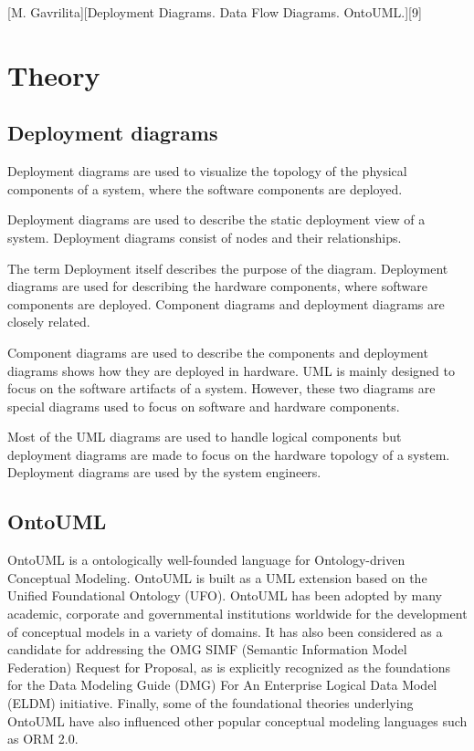 \documentclass{article}
\begin{document}
	[M. Gavrilita][Deployment Diagrams. Data Flow Diagrams. OntoUML.][9]

	\section{Theory}
		\subsection{Deployment diagrams}
			Deployment diagrams are used to visualize the topology of the physical components of a system, where the software components are deployed.

			Deployment diagrams are used to describe the static deployment view of a system. Deployment diagrams consist of nodes and their relationships.

			The term Deployment itself describes the purpose of the diagram. Deployment diagrams are used for describing the hardware components, where software components are deployed. Component diagrams and deployment diagrams are closely related.

			Component diagrams are used to describe the components and deployment diagrams shows how they are deployed in hardware.
			UML is mainly designed to focus on the software artifacts of a system. However, these two diagrams are special diagrams used to focus on software and hardware components.

			Most of the UML diagrams are used to handle logical components but deployment diagrams are made to focus on the hardware topology of a system. Deployment diagrams are used by the system engineers.

		\subsection{OntoUML}
			OntoUML is a ontologically well-founded language for Ontology-driven Conceptual Modeling. OntoUML is built as a UML extension based on the Unified Foundational Ontology (UFO). OntoUML has been adopted by many academic, corporate and governmental institutions worldwide for the development of conceptual models in a variety of domains. It has also been considered as a candidate for addressing the OMG SIMF (Semantic Information Model Federation) Request for Proposal, as is explicitly recognized as the foundations for the Data Modeling Guide (DMG) For An Enterprise Logical Data Model (ELDM) initiative. Finally, some of the foundational theories underlying OntoUML have also influenced other popular conceptual modeling languages such as ORM 2.0.
\end{document}
